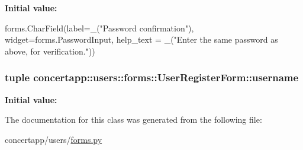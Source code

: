 \label{classconcertapp_1_1users_1_1forms_1_1_user_register_form_aeab66be8612b1125afe40fe53a5ed579}
{\bfseries Initial value:}
\begin{DoxyCode}
forms.CharField(label=_("Password confirmation"), widget=forms.PasswordInput,
                                help_text = _("Enter the same password as above, 
      for verification."))
\end{DoxyCode}
\hypertarget{classconcertapp_1_1users_1_1forms_1_1_user_register_form_a9b360fa9bfa5130e230ce2c360fcf920}{
\subsubsection[{username}]{\setlength{\rightskip}{0pt plus 5cm}tuple {\bf concertapp::users::forms::UserRegisterForm::username}}}
\label{classconcertapp_1_1users_1_1forms_1_1_user_register_form_a9b360fa9bfa5130e230ce2c360fcf920}
{\bfseries Initial value:}


The documentation for this class was generated from the following file:\begin{DoxyCompactItemize}
\item 
concertapp/users/\hyperlink{users_2forms_8py}{forms.py}\end{DoxyCompactItemize}

